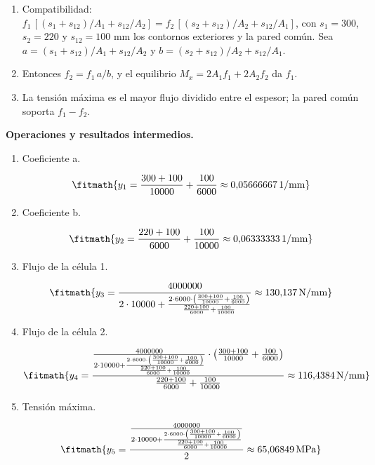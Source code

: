 \begin{enumerate}

\item Compatibilidad: $f_1\,[(s_1 + s_{12})/A_1 + s_{12}/A_2] = f_2\,[(s_2 + s_{12})/A_2 + s_{12}/A_1]$, con $s_1 = 300$, $s_2 = 220$ y $s_{12} = 100$ mm los contornos exteriores y la pared común. Sea $a = (s_1 + s_{12})/A_1 + s_{12}/A_2$ y $b = (s_2 + s_{12})/A_2 + s_{12}/A_1$.

\item Entonces $f_2 = f_1\,a/b$, y el equilibrio $M_x = 2A_1 f_1 + 2A_2 f_2$ da $f_1$.

\item La tensión máxima es el mayor flujo dividido entre el espesor; la pared común soporta $f_1 - f_2$.

\end{enumerate}

\noindent\textbf{Operaciones y resultados intermedios.}

\begin{enumerate}

\item Coeficiente a.

\[\fitmath{y_{1}=\frac{300+100}{10000}+\frac{100}{6000}\approx 0{,}05666667\,\mathrm{1/mm}}\]

\item Coeficiente b.

\[\fitmath{y_{2}=\frac{220+100}{6000}+\frac{100}{10000}\approx 0{,}06333333\,\mathrm{1/mm}}\]

\item Flujo de la célula 1.

\[\fitmath{y_{3}=\frac{4000000}{2\cdot 10000+\frac{2\cdot 6000\cdot \left(\frac{300+100}{10000}+\frac{100}{6000}\right)}{\frac{220+100}{6000}+\frac{100}{10000}}}\approx 130{,}137\,\mathrm{N/mm}}\]

\item Flujo de la célula 2.

\[\fitmath{y_{4}=\frac{\frac{4000000}{2\cdot 10000+\frac{2\cdot 6000\cdot \left(\frac{300+100}{10000}+\frac{100}{6000}\right)}{\frac{220+100}{6000}+\frac{100}{10000}}}\cdot \left(\frac{300+100}{10000}+\frac{100}{6000}\right)}{\frac{220+100}{6000}+\frac{100}{10000}}\approx 116{,}4384\,\mathrm{N/mm}}\]

\item Tensión máxima.

\[\fitmath{y_{5}=\frac{\frac{4000000}{2\cdot 10000+\frac{2\cdot 6000\cdot \left(\frac{300+100}{10000}+\frac{100}{6000}\right)}{\frac{220+100}{6000}+\frac{100}{10000}}}}{2}\approx 65{,}06849\,\mathrm{MPa}}\]

\end{enumerate}
